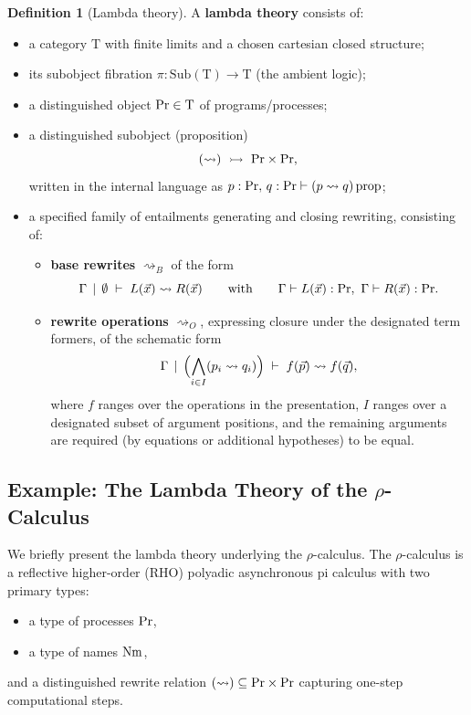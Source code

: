 \documentclass[11pt]{article}
\theoremstyle{definition}
\newtheorem{definition}{Definition}[section]
\theoremstyle{plain}
\theoremstyle{remark}
\theoremstyle{plain}
\renewcommand{\Pr}{{\rm Pr}}
\newcommand{\Nm}{{\rm Nm}}
\newcommand{\rsq}{\rightsquigarrow}
\newcommand{\ctx}{\,|\,}
\newcommand{\mrm}[1]{\mathrm{#1}}
\newcommand{\T}{\mrm{T}}
\begin{document}
\begin{definition}[Lambda theory]
\label{def:lambdatheory}
A \textbf{lambda theory} consists of:
\begin{itemize}
  \item a category $\T$ with finite limits and a chosen cartesian closed structure\cite{BarrWells,AdamekRosickyVitale};
  \item its subobject fibration $\pi:\mrm{Sub}(\T)\to \T$ (the ambient logic);
  \item a distinguished object $\Pr\in \T$ of programs/processes;
  \item a distinguished subobject (proposition)
    \[
      (\rsq)\ \rightarrowtail\ \Pr\times \Pr,
    \]
    written in the internal language as $p:\Pr,\,q:\Pr \vdash (p\rsq q)\,\mrm{prop}$;
  \item a specified family of entailments generating and closing rewriting, consisting of:
  \begin{itemize}
    \item \textbf{base rewrites} $\rsq_B$ of the form
      \[
        \Gamma \;\ctx\; \emptyset \;\vdash\; L(\vec x)\rsq R(\vec x)
        \qquad\text{with}\qquad
        \Gamma \vdash L(\vec x):\Pr,\ \Gamma \vdash R(\vec x):\Pr.
      \]
    \item \textbf{rewrite operations} $\rsq_O$, expressing closure under the
      designated term formers, of the schematic form
      \[
        \Gamma\;\ctx\;\Bigl(\bigwedge_{i\in I} (p_i\rsq q_i)\Bigr)\;\vdash\;
        f(\vec p)\rsq f(\vec q),
      \]
      where $f$ ranges over the operations in the presentation, $I$ ranges over a designated subset of argument positions, and the remaining arguments are required (by equations or additional hypotheses) to be equal.
  \end{itemize}
\end{itemize}
\end{definition}

\subsection{Example: The Lambda Theory of the \texorpdfstring{$\rho$}{rho}-Calculus}
\label{subsec:rho-lambda-theory}

We briefly present the lambda theory underlying the $\rho$-calculus\cite{MeredithRadestock, Lybech2022}.  The $\rho$-calculus is a reflective higher-order (RHO)
polyadic asynchronous pi calculus\cite{Milner1993} with two primary types:
\begin{itemize}
  \item a type of processes $\Pr$,
  \item a type of names $\Nm$,
\end{itemize}
and a distinguished rewrite relation $(\rsq)\subseteq \Pr\times\Pr$ capturing one-step
computational steps.
\end{document}
